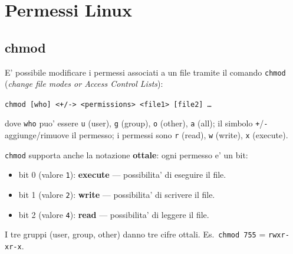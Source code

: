 
\section{Permessi Linux}

\subsection{chmod}
E' possibile modificare i permessi associati a un file tramite il comando \texttt{chmod} (\textit{change file modes or Access Control Lists}):
\begin{center}
  \texttt{chmod [who] <+/-> <permissions> <file1> [file2] \dots}
\end{center}
dove \texttt{who} puo' essere \texttt{u} (user), \texttt{g} (group), \texttt{o} (other), \texttt{a} (all); il simbolo \texttt{+}/\texttt{-} aggiunge/rimuove il permesso; i permessi sono \texttt{r} (read), \texttt{w} (write), \texttt{x} (execute).

\texttt{chmod} supporta anche la notazione \textbf{ottale}: ogni permesso e' un bit:
\begin{itemize}
  \item bit 0 (valore \texttt{1}): \textbf{execute} — possibilita' di eseguire il file.
  \item bit 1 (valore \texttt{2}): \textbf{write} — possibilita' di scrivere il file.
  \item bit 2 (valore \texttt{4}): \textbf{read} — possibilita' di leggere il file.
\end{itemize}
I tre gruppi (user, group, other) danno tre cifre ottali. Es.\ \texttt{chmod 755} = \texttt{rwxr-xr-x}.


